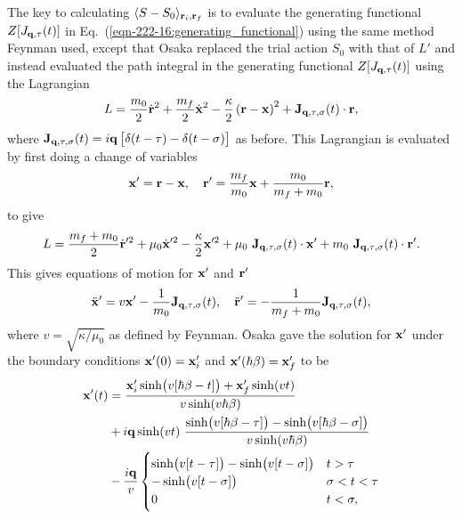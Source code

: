 The key to calculating $\langle S - S_0 \rangle_{\vb{r}_i, \vb{r}_f}$ is to evaluate the generating functional $Z[J_{\vb{q},\tau}(t)]$ in Eq.~(\ref{eqn-222-16:generating_functional}) using the same method Feynman used, except that Osaka replaced the trial action $S_0$ with that of $L'$ and instead evaluated the path integral in the generating functional $Z[J_{\vb{q},\tau}(t)]$ using the Lagrangian
\begin{equation}
    L = \frac{m_0}{2} \dot{\vb{r}}^2 + \frac{m_f}{2}\dot{\vb{x}}^2 - \frac{\kappa}{2} \left( \vb{r} - \vb{x} \right)^2 + \vb{J}_{\vb{q}, \tau, \sigma}(t) \cdot \vb{r},
\label{eqn-223-16:osaka_trial_lagrangian}
\end{equation}
where $\vb{J}_{\vb{q}, \tau, \sigma}(t) = i \vb{q} \left[ \delta(t-\tau) - \delta(t-\sigma) \right]$ as before. This Lagrangian is evaluated by first doing a change of variables
\begin{equation}
    \vb{x}' = \vb{r} - \vb{x}, \quad \vb{r}' = \frac{m_f}{m_0} \vb{x} + \frac{m_0}{m_f + m_0} \vb{r},
\label{eqn-223-17}
\end{equation}
to give
\begin{equation}
    L = \frac{m_f+m_0}{2} \dot{\vb{r}}'^2 + \mu_0 \dot{\vb{x}}'^2 - \frac{\kappa}{2} \vb{x}'^2 +\mu_0\ \vb{J}_{\vb{q}, \tau, \sigma}(t) \cdot \vb{x}' + m_0\ \vb{J}_{\vb{q}, \tau, \sigma}(t) \cdot \vb{r}'.
\label{eqn-223-18}
\end{equation}
This gives equations of motion for $\vb{x}'$ and $\vb{r}'$
\begin{equation}
    \ddot{\vb{x}}' = v\vb{x}' - \frac{1}{m_0} \vb{J}_{\vb{q}, \tau, \sigma}(t), \quad \ddot{\vb{r}}' = -\frac{1}{m_f+m_0} \vb{J}_{\vb{q}, \tau, \sigma}(t),
\label{eqn-223-18:osaka_eoms}
\end{equation}
where $v = \sqrt{\kappa / \mu_0}$ as defined by Feynman. \=Osaka gave the solution for $\vb{x}'$ under the boundary conditions $\vb{x}'(0) = \vb{x}'_i$ and $\vb{x}'(\hbar \beta) = \vb{x}'_f$ to be
\begin{equation}
    \begin{aligned}
    \vb{x}'(t) &= \frac{\vb{x}'_i \sinh (v[\hbar\beta - t]) + \vb{x}'_f \sinh(vt)}{v\sinh(v\hbar\beta)} \\
    &+ i\vb{q} \sinh(vt)\ \frac{\sinh(v[\hbar\beta - \tau]) - \sinh(v[\hbar\beta - \sigma])}{v\sinh(v\hbar\beta)} \\
    &- \frac{i\vb{q}}{v}
    \begin{cases}
        \sinh(v[t-\tau]) - \sinh(v[t-\sigma]) & t > \tau \\
        -\sinh(v[t-\sigma]) & \sigma < t < \tau \\
        0 & t < \sigma,
    \end{cases}
    \end{aligned}
\label{eqn-223-20}
\end{equation}
